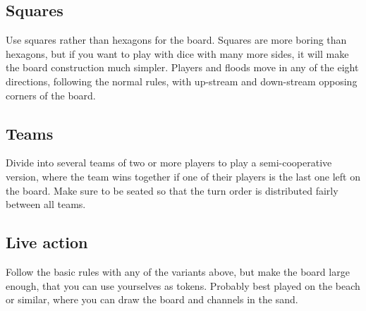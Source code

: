 \subsection{Squares}
Use squares rather than hexagons for the board. Squares are more boring than
hexagons, but if you want to play with dice with many more sides, it will make
the board construction much simpler. Players and floods move in any of the
eight directions, following the normal rules, with up-stream and down-stream
opposing corners of the board.

\subsection{Teams}
Divide into several teams of two or more players to play a semi-cooperative
version, where the team wins together if one of their players is the last one
left on the board. Make sure to be seated so that the turn order is distributed
fairly between all teams.

\subsection{Live action}
Follow the basic rules with any of the variants above, but make the board large
enough, that you can use yourselves as tokens. Probably best played on the
beach or similar, where you can draw the board and channels in the sand.
